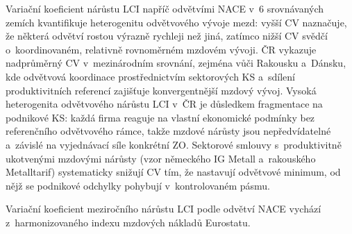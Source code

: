 Variační koeficient nárůstu \ac{LCI} napříč odvětvími \ac{NACE} v~6 srovnávaných zemích kvantifikuje heterogenitu odvětvového vývoje mezd: vyšší CV naznačuje, že některá odvětví rostou výrazně rychleji než jiná, zatímco nižší CV svědčí o~koordinovaném, relativně rovnoměrném mzdovém vývoji.
\ac{ČR} vykazuje nadprůměrný CV v~mezinárodním srovnání, zejména vůči Rakousku a~Dánsku, kde odvětvová koordinace prostřednictvím sektorových \ac{KS} a~sdílení produktivitních referencí zajišťuje konvergentnější mzdový vývoj.
Vysoká heterogenita odvětvového nárůstu \ac{LCI} v~ČR je důsledkem fragmentace na podnikové \ac{KS}: každá firma reaguje na vlastní ekonomické podmínky bez referenčního odvětvového rámce, takže mzdové nárůsty jsou nepředvídatelné a~závislé na vyjednávací síle konkrétní \ac{ZO}.
Sektorové smlouvy s~produktivitně ukotvenými mzdovými nárůsty (vzor německého IG Metall a~rakouského Metalltarif) systematicky snižují CV tím, že nastavují odvětvové minimum, od nějž se podnikové odchylky pohybují v~kontrolovaném pásmu.

Variační koeficient meziročního nárůstu \acs{LCI} podle odvětví \acs{NACE} vychází z~harmonizovaného indexu mzdových nákladů Eurostatu.\par


